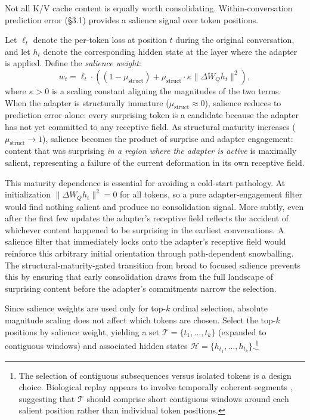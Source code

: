 \documentclass[11pt]{article}
\newcommand{\norm}[1]{\lVert #1 \rVert}
\begin{document}
Not all K/V cache content is equally worth consolidating. Within-conversation prediction error (\S 3.1) provides a salience signal over token positions.

Let $\ell_t$ denote the per-token loss at position $t$ during the original conversation, and let $h_t$ denote the corresponding hidden state at the layer where the adapter is applied. Define the \emph{salience weight}:
\begin{equation}\label{eq:salience}
    w_t = \ell_t \cdot \left( (1-\mu_\text{struct}) + \mu_\text{struct} \cdot \kappa \norm{\Delta W_Q h_t}^2 \right),
\end{equation}
where $\kappa > 0$ is a scaling constant aligning the magnitudes of the two terms. When the adapter is structurally immature ($\mu_\text{struct} \approx 0$), salience reduces to prediction error alone: every surprising token is a candidate because the adapter has not yet committed to any receptive field. As structural maturity increases ($\mu_\text{struct} \to 1$), salience becomes the product of surprise and adapter engagement: content that was surprising \emph{in a region where the adapter is active} is maximally salient, representing a failure of the current deformation in its own receptive field.

This maturity dependence is essential for avoiding a cold-start pathology. At initialization $\norm{\Delta W_Q h_t}^2 = 0$ for all tokens, so a pure adapter-engagement filter would find nothing salient and produce no consolidation signal. More subtly, even after the first few updates the adapter's receptive field reflects the accident of whichever content happened to be surprising in the earliest conversations. A salience filter that immediately locks onto the adapter's receptive field would reinforce this arbitrary initial orientation through path-dependent snowballing. The structural-maturity-gated transition from broad to focused salience prevents this by ensuring that early consolidation draws from the full landscape of surprising content before the adapter's commitments narrow the selection.

Since salience weights are used only for top-$k$ ordinal selection, absolute magnitude scaling does not affect which tokens are chosen. Select the top-$k$ positions by salience weight, yielding a set $\mathcal{T} = \{t_1, \ldots, t_k\}$ (expanded to contiguous windows) and associated hidden states $\mathcal{H} = \{h_{t_1}, \ldots, h_{t_k}\}$.\footnote{The selection of contiguous subsequences versus isolated tokens is a design choice. Biological replay appears to involve temporally coherent segments \cite{wilson1994}, suggesting that $\mathcal{T}$ should comprise short contiguous windows around each salient position rather than individual token positions.}
\end{document}
